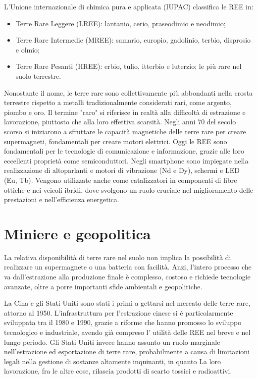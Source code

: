 \documentclass[12pt,a4paper,oneside]{book}
\begin{document}
L'Unione internazionale di chimica pura e applicata (IUPAC) classifica le REE in:
\begin{itemize}
    \item Terre Rare Leggere (LREE): lantanio, cerio, praseodimio e neodimio;
    \item Terre Rare Intermedie (MREE): samario, europio, gadolinio, terbio, disprosio e olmio;
    \item Terre Rare Pesanti (HREE): erbio, tulio, itterbio e luterzio; le più rare nel suolo terrestre.
\end{itemize}

Nonostante il nome, le terre rare sono collettivamente più abbondanti nella crosta terrestre rispetto a metalli tradizionalmente considerati rari, come argento, piombo e oro. Il termine "raro" si riferisce in realtà alla difficoltà di estrazione e lavorazione, piuttosto che alla loro effettiva scarsità.
Negli anni 70 del secolo scorso si iniziarono a sfruttare le capacità magnetiche delle terre rare per creare supermagneti, fondamentali per creare motori elettrici.
Oggi le REE sono fondamentali per le tecnologie di comunicazione e informazione, grazie alle loro eccellenti proprietà come semiconduttori. Negli smartphone sono impiegate nella realizzazione di altoparlanti e motori di vibrazione (Nd e Dy), schermi e LED (Eu, Tb). Vengono utilizzate anche come catalizzatori in componenti di fibre ottiche e nei veicoli ibridi, dove svolgono un ruolo cruciale nel miglioramento delle prestazioni e nell'efficienza energetica.

\section{Miniere e geopolitica}
La relativa disponibilità di terre rare nel suolo non implica la possibilità di realizzare un supermagnete o una batteria con facilità. Anzi, l'intero processo che va dall'estrazione alla produzione finale è complesso, costoso e richiede tecnologie avanzate, oltre a porre importanti sfide ambientali e geopolitiche.

La Cina e gli Stati Uniti sono stati i primi a gettarsi nel mercato delle terre rare, attorno al 1950. L'infrastruttura per l'estrazione cinese si è particolarmente sviluppata tra il 1980 e 1990, grazie a riforme che hanno promosso lo sviluppo tecnologico e industriale, avendo già compreso l' utilità delle REE nel breve e nel lungo periodo. Gli Stati Uniti invece hanno assunto un ruolo marginale nell'estrazione ed esportazione di terre rare, probabilmente a causa di limitazioni legali nella gestione di sostanze altamente inquinanti, in quanto La loro lavorazione, fra le altre cose, rilascia prodotti di scarto tossici e radioattivi.
\end{document}
